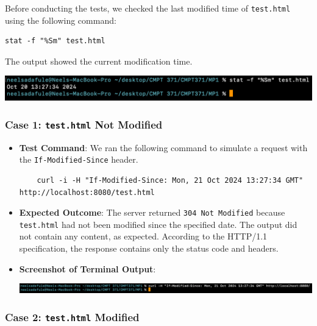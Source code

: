 \documentclass{article}
\begin{document}
Before conducting the tests, we checked the last modified time of \texttt{test.html} using the following command:
\begin{lstlisting}
stat -f "%Sm" test.html
\end{lstlisting}
The output showed the current modification time.

\begin{center}
    \includegraphics[width=\textwidth]{screenshots/check_last_modified.png}  %
\end{center}

\subsubsection*{Case 1: \texttt{test.html} Not Modified}

\begin{itemize}
    \item \textbf{Test Command}: We ran the following command to simulate a request with the \texttt{If-Modified-Since} header.
    \begin{lstlisting}
    curl -i -H "If-Modified-Since: Mon, 21 Oct 2024 13:27:34 GMT" http://localhost:8080/test.html
    \end{lstlisting}

    \item \textbf{Expected Outcome}: The server returned \texttt{304 Not Modified} because \texttt{test.html} had not been modified since the specified date. The output did not contain any content, as expected. According to the HTTP/1.1 specification, the response contains only the status code and headers.

    \item \textbf{Screenshot of Terminal Output}:
    \begin{center}
        \includegraphics[width=\textwidth]{screenshots/304_Not_Modified.png}  %
    \end{center}
\end{itemize}

\subsubsection*{Case 2: \texttt{test.html} Modified}
\end{document}
